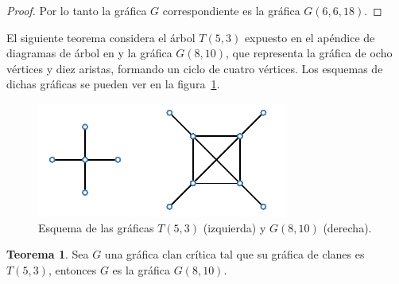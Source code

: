 \documentclass[12pt]{book}
\theoremstyle{definition}
\newtheorem{theorem}{Teorema}[chapter]
\begin{document}
\begin{proof}
Por lo tanto la gráfica $G$ correspondiente es la gráfica $G(6,6,18)$.
\end{proof}

El siguiente teorema considera el árbol $T(5,3)$ expuesto en el apéndice de diagramas de árbol en \cite{Harary:1969} y la gráfica $G(8,10)$, que representa la gráfica de ocho vértices y diez aristas, formando un ciclo de cuatro vértices. Los esquemas de dichas gráficas se pueden ver en la figura~\ref{F9}.

\begin{figure}[!htbp]
	\centering
	\includegraphics[scale=1.2]{Fig9.pdf}
	\caption{Esquema de las gráficas $T(5,3)$ (izquierda) y $G(8,10)$ (derecha).\label{F9}}
\end{figure}

\begin{theorem}
Sea $G$ una gráfica clan crítica tal que su gráfica de clanes es $T(5,3)$, entonces $G$ es la gráfica $G(8,10)$.
\end{theorem}






\end{document}
